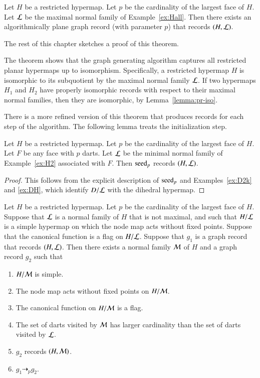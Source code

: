 \begin{theorem}\label{lemma:bn}
  Let $H$ be a restricted hypermap.  Let $p$ be the cardinality of the
  largest face of $H$. Let ${\cal L}$ be the maximal normal family of
  Example~\ref{ex:Hall}.  Then there exists an algorithmically plane
  graph record (with parameter $p$) that records $(H,{\cal L})$.
\end{theorem}

The rest of this chapter sketches a proof of this theorem.

The theorem shows that the graph generating algorithm captures all
restricted planar hypermaps up to isomorphism.  Specifically, a
restricted hypermap $H$ is isomorphic to its subquotient by the maximal
normal family ${\cal L}$.  If two hypermaps $H_1$ and $H_2$ have
properly isomorphic records with respect to their maximal normal
families, then they are isomorphic, by Lemma~\ref{lemma:pr-iso}.


There is a more refined version of this theorem that produces records for each
step of the algorithm.  The following lemma treats the initialization step.

\begin{lemma}\label{lemma:algo-init}
  Let $H$ be a restricted hypermap.  Let $p$ be the cardinality of the
  largest face of $H$.  Let $F$ be any face with $p$ darts.  Let
  ${\cal L}$ be the minimal normal family of Example~\ref{ex:H2}
  associated with $F$.  Then ${\operatorname{seed}}_p$ records $(H,{\cal L})$.
\end{lemma}

\begin{proof}
  This follows from the explicit description of ${\operatorname{seed}}_p$ and
  Examples~\ref{ex:D2k} and \ref{ex:DH}, which identify $D/{\cal L}$
  with the dihedral hypermap.
\end{proof}


\begin{lemma}\label{lemma:algo-step}  
  Let $H$ be a restricted hypermap.  Let $p$ be the cardinality of the
  largest face of $H$.  Suppose that ${\cal L}$ is a normal family of
  $H$ that is not maximal, and such that $H/{\cal L}$ is a simple
  hypermap on which the node map acts without fixed points.  Suppose
  that the canonical function is a flag on $H/{\cal L}$.  Suppose that
  $g_1$ is a graph record that records $(H,{\cal L})$.
  Then there exists a normal family ${\cal M}$ of $H$ and a graph
  record $g_2$ such that
\begin{enumerate}
\item $H/{\cal M}$ is simple.
\item The node map acts without fixed points on $H/{\cal M}$.
\item The canonical function on $H/{\cal M}$ is a flag.
\item The set of darts visited by ${\cal M}$ has larger cardinality than the set of
darts visited by ${\cal L}$.
\item $g_2$ records $(H,{\cal M})$.
\item $g_1 \dashrightarrow_p g_2$.
\end{enumerate}
\end{lemma}

